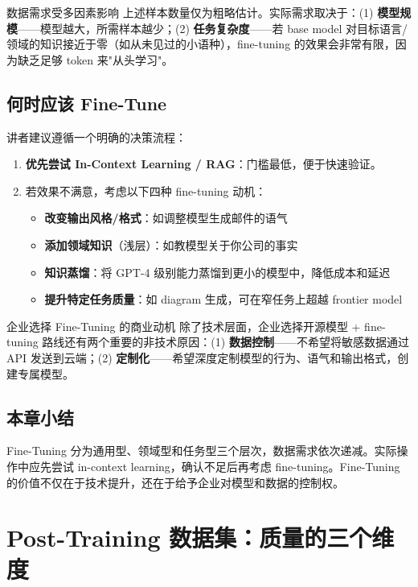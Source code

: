 \documentclass[a4paper]{article}
\begin{document}
\begin{warningbox}{数据需求受多因素影响}
上述样本数量仅为粗略估计。实际需求取决于：(1) \textbf{模型规模}——模型越大，所需样本越少；(2) \textbf{任务复杂度}——若 base model 对目标语言/领域的知识接近于零（如从未见过的小语种），fine-tuning 的效果会非常有限，因为缺乏足够 token 来"从头学习"。
\end{warningbox}

\subsection{何时应该 Fine-Tune}

讲者建议遵循一个明确的决策流程：

\begin{enumerate}
    \item \textbf{优先尝试 In-Context Learning / RAG}：门槛最低，便于快速验证。
    \item 若效果不满意，考虑以下四种 fine-tuning 动机：
    \begin{itemize}
        \item \textbf{改变输出风格/格式}：如调整模型生成邮件的语气
        \item \textbf{添加领域知识}（浅层）：如教模型关于你公司的事实
        \item \textbf{知识蒸馏}：将 GPT-4 级别能力蒸馏到更小的模型中，降低成本和延迟
        \item \textbf{提升特定任务质量}：如 diagram 生成，可在窄任务上超越 frontier model
    \end{itemize}
\end{enumerate}

\begin{knowledgebox}{企业选择 Fine-Tuning 的商业动机}
除了技术层面，企业选择开源模型 + fine-tuning 路线还有两个重要的非技术原因：(1) \textbf{数据控制}——不希望将敏感数据通过 API 发送到云端；(2) \textbf{定制化}——希望深度定制模型的行为、语气和输出格式，创建专属模型。
\end{knowledgebox}

\subsection{本章小结}

Fine-Tuning 分为通用型、领域型和任务型三个层次，数据需求依次递减。实际操作中应先尝试 in-context learning，确认不足后再考虑 fine-tuning。Fine-Tuning 的价值不仅在于技术提升，还在于给予企业对模型和数据的控制权。

\newpage
\section{Post-Training 数据集：质量的三个维度}
\end{document}

